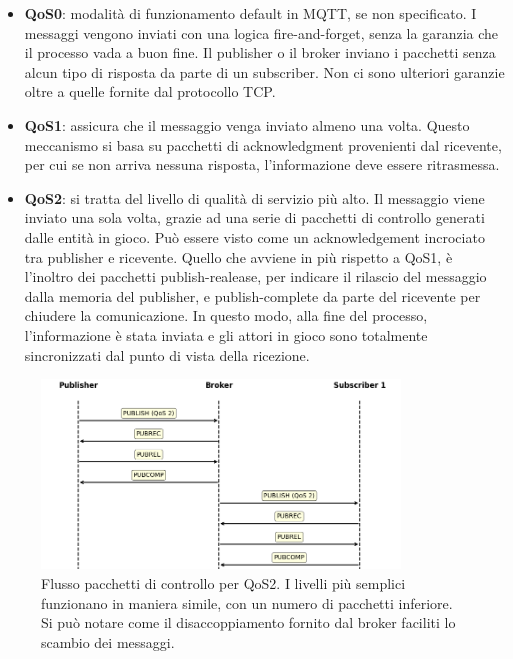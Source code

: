 \begin{itemize}
	\item \textbf{QoS0}: modalità di funzionamento default in MQTT, se non specificato. I messaggi vengono inviati con una logica fire-and-forget, senza la garanzia che il processo vada a buon fine. Il publisher o il broker inviano i pacchetti senza alcun tipo di risposta da parte di un subscriber. Non ci sono ulteriori garanzie oltre a quelle fornite dal protocollo TCP.
	\item \textbf{QoS1}: assicura che il messaggio venga inviato almeno una volta. Questo meccanismo si basa su pacchetti di acknowledgment provenienti dal ricevente, per cui se non arriva nessuna risposta, l'informazione deve essere ritrasmessa.
	\item \textbf{QoS2}: si tratta del livello di qualità di servizio più alto. Il messaggio viene inviato una sola volta, grazie ad una serie di pacchetti di controllo generati dalle entità in gioco. Può essere visto come un acknowledgement incrociato tra publisher e ricevente. Quello che avviene in più rispetto a QoS1, è l'inoltro dei pacchetti publish-realease, per indicare il rilascio del messaggio dalla memoria del publisher, e publish-complete da parte del ricevente per chiudere la comunicazione. In questo modo, alla fine del processo, l'informazione è stata inviata e gli attori in gioco sono totalmente sincronizzati dal punto di vista della ricezione.   
\end{itemize}

\begin{figure}[htbp]
    \centering
    \includegraphics[width=0.85\textwidth]{figures/qos2.png}
    \caption{Flusso pacchetti di controllo per QoS2. I livelli più semplici funzionano in maniera simile, con un numero di pacchetti inferiore. Si può notare come il disaccoppiamento fornito dal broker faciliti lo scambio dei messaggi.}
    \label{fig:qos2}
\end{figure}





